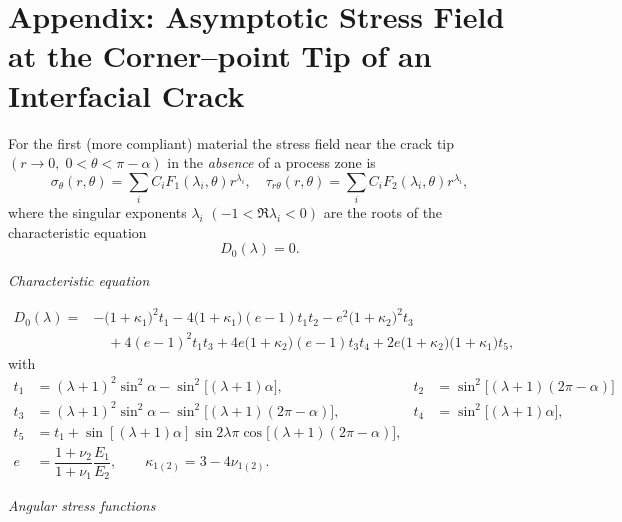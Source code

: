 \makeatletter
\renewcommand*{\theHsection}{App.\Alph{section}}
\makeatother

\section{Appendix: Asymptotic Stress Field at the Corner–point Tip of an Interfacial Crack}
\label{BogdanovaAppA}


For the first (more compliant) material the stress field near the crack tip
\((r\to0,\;0<\theta<\pi-\alpha)\) in the \emph{absence} of a process zone is \cite{Bogdanova12,Bogdanova13}
\begin{equation*}
	\sigma_{\theta}(r,\theta)=\sum_{i}C_i F_1(\lambda_i,\theta) r^{\lambda_i},
	\quad
	\tau_{r\theta}(r,\theta)=\sum_{i}C_i F_2(\lambda_i,\theta) r^{\lambda_i},
\end{equation*}
where the singular exponents \(\lambda_i\) \(( -1<\Re\lambda_i<0)\) are the
roots of the characteristic equation
\begin{equation*}
	D_0(\lambda)=0.
\end{equation*}

\emph{Characteristic equation}

\[
\begin{aligned}
	D_0(\lambda)=
	&-\bigl(1+\kappa_1\bigr)^2 t_1
	-4\bigl(1+\kappa_1\bigr)(e-1) t_1t_2
	-e^{2}\bigl(1+\kappa_2\bigr)^{2} t_3      \\
	&\quad
	+4(e-1)^{2}t_1t_3
	+4e\bigl(1+\kappa_2\bigr)(e-1)t_3t_4
	+2e\bigl(1+\kappa_2\bigr)\bigl(1+\kappa_1\bigr)t_5 ,
\end{aligned}
\]
with
\[
\begin{aligned}
	t_1 &= (\lambda+1)^{2}\sin^{2}\alpha-\sin^{2}\bigl[(\lambda+1)\alpha\bigr],
	&
	t_2 &= \sin^{2}\bigl[(\lambda+1)(2\pi-\alpha)\bigr]
\\
		t_3 &= (\lambda+1)^{2}\sin^{2}\alpha-\sin^{2}\bigl[(\lambda+1)(2\pi-\alpha)\bigr],
	&
		t_4 &= \sin^{2}\bigl[(\lambda+1)\alpha\bigr],
		\\
	t_5 &= t_1+\sin[(\lambda+1)\alpha] 
	\sin 2\lambda\pi 
	\cos\bigl[(\lambda+1)(2\pi-\alpha)\bigr],
\\
	e  &=\dfrac{1+\nu_2}{1+\nu_1}\dfrac{E_1}{E_2},
	\qquad
	\kappa_{1(2)}=3-4\nu_{1(2)}.
\end{aligned}
\]

\emph{Angular stress functions}


